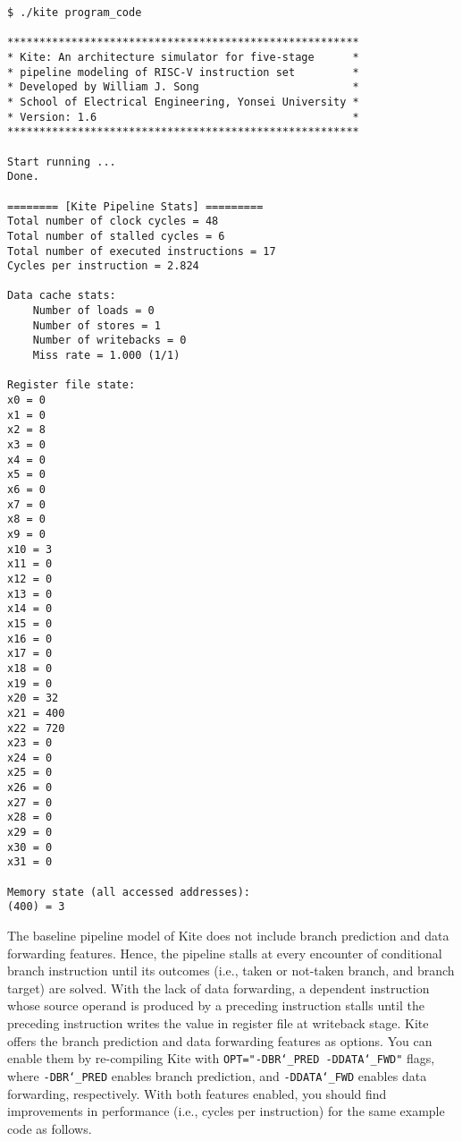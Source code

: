 \documentclass[10pt]{article}
\begin{document}
\begin{Verbatim}[frame=single,fontsize=\small]
$ ./kite program_code

*******************************************************
* Kite: An architecture simulator for five-stage      *
* pipeline modeling of RISC-V instruction set         *
* Developed by William J. Song                        *
* School of Electrical Engineering, Yonsei University *
* Version: 1.6                                        *
*******************************************************

Start running ...
Done.

======== [Kite Pipeline Stats] =========
Total number of clock cycles = 48
Total number of stalled cycles = 6
Total number of executed instructions = 17
Cycles per instruction = 2.824

Data cache stats:
    Number of loads = 0
    Number of stores = 1
    Number of writebacks = 0
    Miss rate = 1.000 (1/1)

Register file state:
x0 = 0
x1 = 0
x2 = 8
x3 = 0
x4 = 0
x5 = 0
x6 = 0
x7 = 0
x8 = 0
x9 = 0
x10 = 3
x11 = 0
x12 = 0
x13 = 0
x14 = 0
x15 = 0
x16 = 0
x17 = 0
x18 = 0
x19 = 0
x20 = 32
x21 = 400
x22 = 720
x23 = 0
x24 = 0
x25 = 0
x26 = 0
x27 = 0
x28 = 0
x29 = 0
x30 = 0
x31 = 0

Memory state (all accessed addresses):
(400) = 3
\end{Verbatim}

The baseline pipeline model of Kite does not include branch prediction and data forwarding features.
Hence, the pipeline stalls at every encounter of conditional branch instruction until its outcomes (i.e., taken or not-taken branch, and branch target) are solved.
With the lack of data forwarding, a dependent instruction whose source operand is produced by a preceding instruction stalls until the preceding instruction writes the value in register file at writeback stage.
Kite offers the branch prediction and data forwarding features as options.
You can enable them by re-compiling Kite with {\tt OPT="-DBR\char`_PRED -DDATA\char`_FWD"} flags, where {\tt -DBR\char`_PRED} enables branch prediction, and {\tt -DDATA\char`_FWD} enables data forwarding, respectively.
With both features enabled, you should find improvements in performance (i.e., cycles per instruction) for the same example code as follows.
\end{document}
